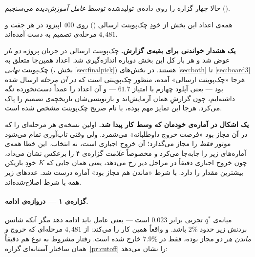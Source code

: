 \documentclass[12pt,a4paper]{article}
\begin{document}
حالا چهار گزاره را روی داده‌ی تولیدشده توسط \emph{عامل آموزش‌دیده}
می‌سنجیم ().

همه‌ی اعداد این بخش از خودِ چک‌پوینت ارسالی () روی
$400$ اپیزود در هر جفت و $4{,}481$ مرحله‌ی تصمیم به دست آمده‌اند.

\begin{answer}
\textbf{یک هشدار خواندنی برای بقیه‌ی گزارش.} چک‌پوینت ارسالی در جریان
پروژه \emph{دو بار} عوض شد و هر بار کل این بخش دوباره اندازه‌گیری شد.
اعداد همین‌جا متعلق به چک‌پوینت \emph{نهایی} (، بخش
\ref{sec:finalpick}) هستند. در بخش‌های \ref{sec:both} تا
\ref{sec:board3} هرجا «چک‌پوینت ارسالی» آمده، منظور چک‌پوینتی است که
\emph{در آن مرحله} ارسال شده بود — یعنی آپلود چهارم با امتیاز $61.7$ —
و آن اعداد را عمداً دست‌نخورده نگه داشته‌ایم، چون گزارشِ همان آزمایش‌اند
و بازنویسی‌شان تاریخچه‌ی تصمیم را پاک می‌کرد. هرجا این تمایز مهم بوده،
با نام صریح چک‌پوینت مشخص شده است.
\end{answer}

\begin{answer}
\textbf{یک اشکال در آماره‌ی خودمان که وسط کار پیدا شد.} اولین نسخه‌ی
 هر مرحله‌ای را که در آن  مجاز بود «فرصت خروج
داوطلبانه» می‌شمرد. ولی وقتی تاب‌آوری تمام می‌شود موتور \emph{فقط}
 را مجاز می‌گذارد؛ آن خروج اجباری است، نه انتخاب. این خطا همه‌ی
آماره‌های زیر را جابه‌جا می‌کرد و مخصوصاً \emph{علامت} گزاره‌ی ۴ را برعکس
نشان می‌داد، چون خروج اجباری دقیقاً در مراحل دیر رخ می‌دهد، یعنی همان جایی
که $K$ خودِ بازیکن بیشترین مقدار را دارد. با شرط «ماندن هم مجاز بود» آماره
درست شد. عددهای زیر همه با شرط اصلاح‌شده‌اند.
\end{answer}

\paragraph{گزاره‌ی ۱ — دروازه‌ی ادامه.}
میانه‌ی $q^\ast$ تجربی برابر $\mathbf{0.023}$ است — یعنی عامل باید ادامه دهد
مگر آنکه شانس بردنش زیر حدود $2\%$ باشد. و واقعاً همین کار را می‌کند: از
$4{,}481$ مرحله‌ای که خروج \emph{و ماندن هر دو} مجاز بوده، فقط در
$\mathbf{7.9\%}$ خارج شده است. رفتار مشروط به نوع هم دقیقاً همان ساختار
آستانه‌ای گزاره~\ref{pr:cutoff} را نشان می‌دهد:
\end{document}
